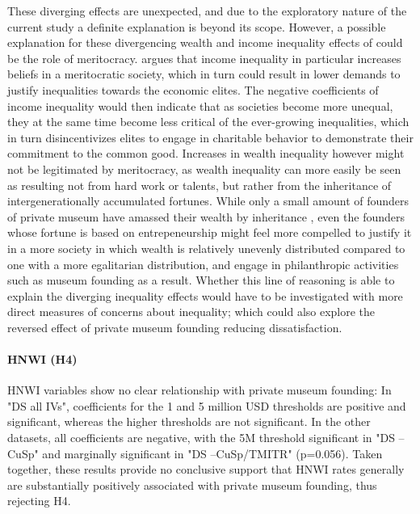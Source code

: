 \documentclass[11pt, authoryear]{elsarticle}
\begin{document}
These diverging effects are unexpected, and due to the exploratory nature of the current study a definite explanation is beyond its scope. 
However, a possible explanation for these divergencing wealth and income inequality effects of could be the role of meritocracy.
\citet{Mijs_2019_paradox} argues that income inequality in particular increases beliefs in a meritocratic society, which in turn could result in lower demands to justify inequalities towards the economic elites.
The negative coefficients of income inequality would then indicate that as societies become more unequal, they at the same time become less critical of the ever-growing inequalities, which in turn disincentivizes elites to engage in charitable behavior to demonstrate their commitment to the common good. 
Increases in wealth inequality however might not be legitimated by meritocracy, as wealth inequality can more easily be seen as resulting not from hard work or talents, but rather from the inheritance of intergenerationally accumulated fortunes.
While only a small amount of founders of private museum have amassed their wealth by inheritance \citep{Velthuis_etal_2023_boom}, even the founders whose fortune is based on entrepeneurship might feel more compelled to justify it in a more society in which wealth is relatively unevenly distributed compared to one with a more egalitarian distribution, and engage in philanthropic activities such as museum founding as a result.
Whether this line of reasoning is able to explain the diverging inequality effects would have to be investigated with more direct measures of concerns about inequality; which could also explore the reversed effect of private museum founding reducing dissatisfaction.




\paragraph*{HNWI (H4)}




HNWI variables show no clear relationship with private museum founding: 
In "DS all IVs", coefficients for the 1 and 5 million USD thresholds are positive and significant, whereas the higher thresholds are not significant.
In the other datasets, all coefficients are negative, with the 5M threshold significant in "DS --CuSp" and marginally significant in "DS --CuSp/TMITR" (p=0.056).
Taken together, these results provide no conclusive support that HNWI rates generally are substantially positively associated with private museum founding, thus rejecting H4.
\end{document}
